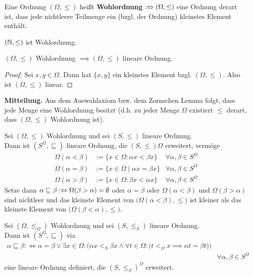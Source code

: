\begin{definition}
Eine Ordnung $(\Omega,\leq)$ heißt \textbf{Wohlordnung} $:\Leftrightarrow(\Omega,\leq)$ eine Ordnung derart ist, dass jede nichtleere Teilmenge ein (bzgl. der Ordnung) kleinstes Element enthält.
\end{definition}

\begin{beispiel}
$(\mathbb{N},\leq)$ ist Wohlordnung.
\end{beispiel}

\begin{bemerkung}
$(\Omega,\leq)$ Wohlordnung $\implies(\Omega,\leq)$ lineare Ordnung.
\end{bemerkung}
\begin{proof}
Sei $x,y\in\Omega$. Dann hat $\lbrace x,y\rbrace$ ein kleinstes Element bzgl. $(\Omega,\leq)$. Also ist $(\Omega,\leq)$ linear.
\end{proof}

\textbf{Mitteilung.} Aus dem Auswahlaxiom bzw. dem Zornschen Lemma folgt, dass jede Menge eine Wohlordnung besitzt (d.h. zu jeder Menge $\Omega$ existiert $\leq$ derart, dass $(\Omega,\leq)$ Wohlordnung ist).

\begin{satz}
Sei $(\Omega,\leq)$ Wohlordnung und sei $(S,\leq)$ lineare Ordnung.\\
Dann ist $(S^\Omega,\sqsubseteq)$ lineare Ordnung, die $(S,\leq)\Omega$ erweitert, vermöge
\begin{align*}
\Omega(\alpha<\beta)&:=\lbrace x\in\Omega:\alpha x<\beta x\rbrace &\forall \alpha,\beta\in S^\Omega\\
\Omega(\alpha=\beta)&:=\lbrace x\in\Omega\mid\alpha x=\beta x\rbrace &\forall \alpha,\beta\in S^\Omega\\
\Omega(\alpha>\beta)&:=\lbrace x\in\Omega:\beta x<\alpha x\rbrace &\forall\alpha,\beta\in S^\Omega
\end{align*}
Setze dann
$\alpha\sqsubseteq\beta:\Leftrightarrow\Omega(\beta>\alpha)=\emptyset$ oder $\alpha=\beta$ oder $\Omega(\alpha<\beta)$ und $\Omega(\beta>\alpha)$ sind nichtleer und das kleinste Element von $\big(\Omega(\alpha<\beta),\leq\big)$ ist kleiner als das kleinste Element von $\big(\Omega(\beta<\alpha),\leq\big)$.
\end{satz}

\begin{satz}
Sei $(\Omega,\leq_\Omega)$ Wohlordnung und sei $(S,\leq_S)$ lineare Ordnung.\\
Dann ist $(S^\Omega,\sqsubseteq)$ via
\begin{align*}
\alpha\sqsubseteq\beta:\Longleftrightarrow\alpha=\beta\vee\exists x\in\Omega:\Big(\alpha x<_S\beta x\wedge\forall t\in\Omega:\big(t<_\Omega x\implies \alpha t=\beta t\big)\Big)
\\&\forall\alpha,\beta\in S^\Omega
\end{align*}
eine lineare Ordnung definiert, die $(S,\leq_S)^\Omega$ erweitert.
\end{satz}

